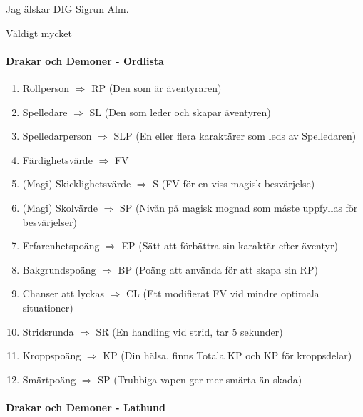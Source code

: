 \documentclass[a4paper, 10pt, titlepage]{article}
\begin{document}
Jag älskar DIG Sigrun Alm.

Väldigt mycket

\paragraph{Drakar och Demoner - Ordlista}
\begin{enumerate}[I]
\item Rollperson $\Rightarrow$ RP (Den som är äventyraren)
\item Spelledare $\Rightarrow$ SL (Den som leder och skapar äventyren)
\item Spelledarperson $\Rightarrow$ SLP (En eller flera karaktärer som leds av Spelledaren)
\item Färdighetsvärde $\Rightarrow$ FV
\item (Magi) Skicklighetsvärde $\Rightarrow$ S (FV för en viss magisk besvärjelse)
\item (Magi) Skolvärde $\Rightarrow$ SP (Nivån på magisk mognad som måste uppfyllas för besvärjelser)
\item Erfarenhetspoäng $\Rightarrow$ EP (Sätt att förbättra sin karaktär efter äventyr)
\item Bakgrundspoäng $\Rightarrow$ BP (Poäng att använda för att skapa sin RP)
\item Chanser att lyckas $\Rightarrow$ CL (Ett modifierat FV vid mindre optimala situationer)
\item Stridsrunda $\Rightarrow$ SR (En handling vid strid, tar 5 sekunder)
\item Kroppspoäng $\Rightarrow$ KP (Din hälsa, finns Totala KP och KP för kroppsdelar)
\item Smärtpoäng $\Rightarrow$ SP (Trubbiga vapen ger mer smärta än skada)
\end{enumerate}

\paragraph{Drakar och Demoner - Lathund}
\end{document}

